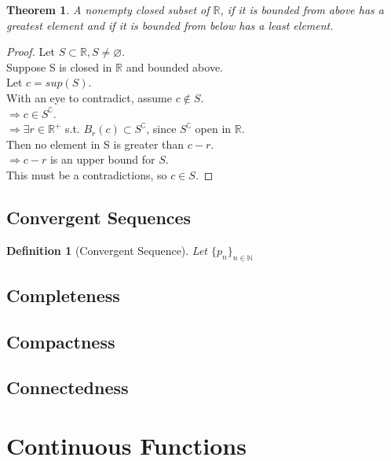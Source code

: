 \documentclass{article}
\newtheorem{definition}{Definition}[section]
\newtheorem{theorem}{Theorem}[section]
\begin{document}
			\begin{theorem}
				A nonempty closed subset of $\mathbb{R}$, if it is bounded from above has a greatest element
				and if it is bounded from below has a least element.
			\end{theorem}
			\begin{proof}
				Let $S \subset \mathbb{R}, S \neq \varnothing$. \\
				Suppose S is closed in $\mathbb{R}$ and bounded above. \\
				Let $c = sup(S)$. \\
				With an eye to contradict, assume $c \notin S$. \\
				$\Rightarrow c \in S^\complement$. \\
				$\Rightarrow \exists r \in \mathbb{R}^+$ s.t. $B_r(c) \subset S^\complement$, since $S^\complement$ open in $\mathbb{R}$. \\
				Then no element in S is greater than $c - r$. \\
				$\Rightarrow c - r$ is an upper bound for $S$. \\
				This must be a contradictions, so $c \in S$.
			\end{proof}

		\subsection{Convergent Sequences}

			\begin{definition}[Convergent Sequence]
				\label{convergent sequence}
				Let $\{ p_n \}_{n \in \mathbb{N}}$
				
			\end{definition}
		
		\subsection{Completeness}
		
		\subsection{Compactness}
		
		\subsection{Connectedness}
	
	\section{Continuous Functions}
\end{document}
